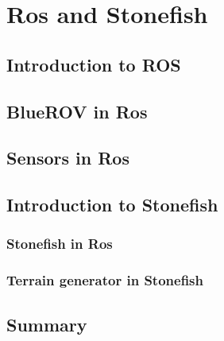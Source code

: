 \chapter{Ros and Stonefish}
\label{chap:fifth}
\ifpdf
    \graphicspath{{Chapter5/Figures/PNG/}{Chapter5/Figures/PDF/}{Chapter5/Figures/}{Chapter5/Figures/EPS/}}
\else
    \graphicspath{{Chapter5/Figures/EPS/}{Chapter5/Figures/}}
\fi


\section{Introduction to ROS}

\section{BlueROV in Ros}

\section{Sensors in Ros}  

\section{Introduction to Stonefish}
\subsection{Stonefish in Ros}
\subsection{Terrain generator in Stonefish}

\section{Summary}